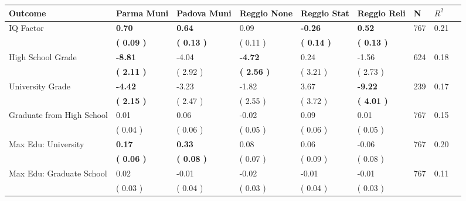 \begin{tabular}{L{6.2cm} C{1.8cm} C{1.8cm} C{1.8cm} C{1.8cm} C{1.8cm} C{1.8cm} C{0.3cm} C{0.3cm}}
\toprule
 \textbf{Outcome} & \textbf{Parma Muni} & \textbf{Padova Muni} & \textbf{Reggio None} & \textbf{Reggio Stat} & \textbf{Reggio Reli} & \textbf{N} & \textbf{$ R^2$} \\
\midrule
IQ Factor & \textbf{     0.70} & \textbf{     0.64} &      0.09 & \textbf{    -0.26} & \textbf{     0.52}  & 767 &       0.21 \\ 
 & \textbf{(     0.09 )} & \textbf{(     0.13 )} & (     0.11 ) & \textbf{(     0.14 )} & \textbf{(     0.13 )}  & \\
High School Grade & \textbf{    -8.81} &     -4.04 & \textbf{    -4.72} &      0.24 &     -1.56  & 624 &       0.18 \\ 
 & \textbf{(     2.11 )} & (     2.92 ) & \textbf{(     2.56 )} & (     3.21 ) & (     2.73 )  & \\
University Grade & \textbf{    -4.42} &     -3.23 &     -1.82 &      3.67 & \textbf{    -9.22}  & 239 &       0.17 \\ 
 & \textbf{(     2.15 )} & (     2.47 ) & (     2.55 ) & (     3.72 ) & \textbf{(     4.01 )}  & \\
Graduate from High School &      0.01 &      0.06 &     -0.02 &      0.09 &      0.01  & 767 &       0.15 \\ 
 & (     0.04 ) & (     0.06 ) & (     0.05 ) & (     0.06 ) & (     0.05 )  & \\
Max Edu: University & \textbf{     0.17} & \textbf{     0.33} &      0.08 &      0.06 &     -0.06  & 767 &       0.20 \\ 
 & \textbf{(     0.06 )} & \textbf{(     0.08 )} & (     0.07 ) & (     0.09 ) & (     0.08 )  & \\
Max Edu: Graduate School &      0.02 &     -0.01 &     -0.02 &     -0.01 &     -0.01  & 767 &       0.11 \\ 
 & (     0.03 ) & (     0.04 ) & (     0.03 ) & (     0.04 ) & (     0.03 )  & \\
\bottomrule
\end{tabular}
